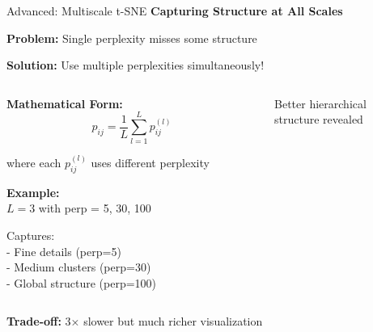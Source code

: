 \documentclass[10pt]{beamer}
\newcommand{\emphtext}[1]{\textcolor{upcblue}{\textbf{#1}}}
\newcommand{\warningbox}[1]{\colorbox{red!10}{\begin{minipage}{0.85\textwidth}\centering #1\end{minipage}}}
\begin{document}
\begin{frame}{Advanced: Multiscale t-SNE}
\emphtext{Capturing Structure at All Scales}

\vspace{0.3cm}
\textbf{Problem:} Single perplexity misses some structure

\textbf{Solution:} Use multiple perplexities simultaneously!

\vspace{0.3cm}
\begin{columns}[T]
\begin{column}{0.48\textwidth}
\textbf{Mathematical Form:}
\footnotesize
$$p_{ij} = \frac{1}{L}\sum_{l=1}^L p_{ij}^{(l)}$$

where each $p_{ij}^{(l)}$ uses different perplexity

\vspace{0.2cm}
\textbf{Example:}\\
$L=3$ with perp = {5, 30, 100}

\vspace{0.2cm}
Captures:\\
- Fine details (perp=5)\\
- Medium clusters (perp=30)\\
- Global structure (perp=100)
\end{column}

\begin{column}{0.48\textwidth}

\footnotesize
Better hierarchical\\
structure revealed
\end{column}
\end{columns}

\vspace{0.3cm}
\begin{center}
\warningbox{\footnotesize\textbf{Trade-off:} 3× slower but much richer visualization}
\end{center}
\end{frame}
\end{document}
